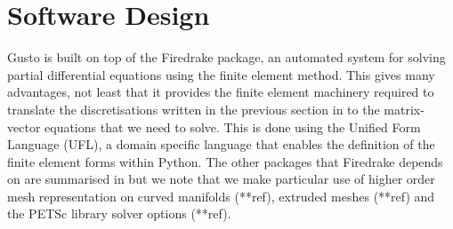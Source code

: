 \documentclass[journal abbreviation, manuscript]{copernicus}
\begin{document}
\section{Software Design}
\label{sec: design}
Gusto is built on top of the Firedrake package, an automated system
for solving partial differential equations using the finite element
method. This gives many advantages, not least that it provides the
finite element machinery required to translate the discretisations
written in the previous section in to the matrix-vector equations that
we need to solve. This is done using the Unified Form Language (UFL),
a domain specific language that enables the definition of the finite
element forms within Python. The other packages that Firedrake depends
on are summarised in \citet{davies2022towards} but we note that we
make particular use of higher order mesh representation on curved
manifolds (**ref), extruded meshes (**ref) and the PETSc library
solver options (**ref).

\begin{figure}
\end{figure}
\end{document}
